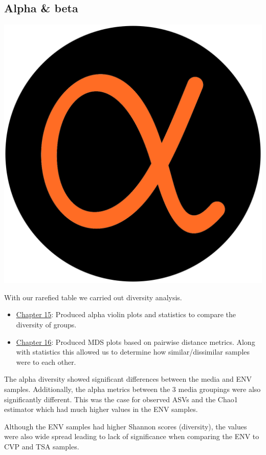 \documentclass[
]{book}
\providecommand{\tightlist}{%
  \setlength{\itemsep}{0pt}\setlength{\parskip}{0pt}}
\begin{document}
\hypertarget{alpha-beta}{%
\subsection{Alpha \& beta}\label{alpha-beta}}

\includegraphics{figures/alpha.png}

With our rarefied table we carried out diversity analysis.

\begin{itemize}
\tightlist
\item
  \protect\hyperlink{alpha_chap}{Chapter 15}: Produced alpha violin plots and statistics to compare the diversity of groups.
\item
  \protect\hyperlink{beta_chap}{Chapter 16}: Produced MDS plots based on pairwise distance metrics. Along with statistics this allowed us to determine how similar/dissimilar samples were to each other.
\end{itemize}

The alpha diversity showed significant differences between the media and ENV samples.
Additionally, the alpha metrics between the 3 media groupings were also significantly different.
This was the case for observed ASVs and the Chao1 estimator which had much higher values in the ENV samples.

Although the ENV samples had higher Shannon scores (diversity), the values were also wide spread leading to lack of significance when comparing the ENV to CVP and TSA samples.
\end{document}
